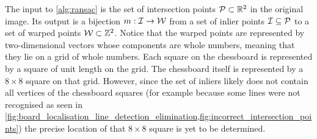 \documentclass[../report.tex]{subfiles}
\begin{document}
The input to \cref{alg:ransac} is the set of intersection points ${\mathcal{P}} \subset \mathbb{R}^2$ in the original image.
Its output is a bijection $m : {\mathcal{I}} \to {\mathcal{W}}$ from a set of inlier points ${\mathcal{I}} \subseteq {\mathcal{P}}$ to a set of warped points ${\mathcal{W}} \subset \mathbb{Z}^2$. 
Notice that the warped points are represented by two-dimensional vectors whose components are whole numbers, meaning that they lie on a grid of whole numbers.
Each square on the chessboard is represented by a square of unit length on the grid.
The chessboard itself is represented by a $8 \times 8$ square on that grid.
However, since the set of inliers likely does not contain all vertices of the chessboard squares (for example because some lines were not recognised as seen in \cref{fig:board_localisation_line_detection_elimination,fig:incorrect_intersection_points}) the precise location of that $8 \times 8$ square is yet to be determined.
\end{document}
